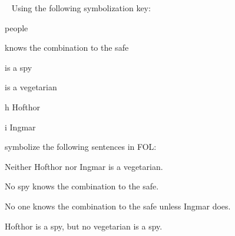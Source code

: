 \
\problempart
\label{pr.FOLvegetarians}
Using the following symbolization key:
\begin{ekey}
\item[\text{论域}] people
\item[\atom{K}{x}]  knows the combination to the safe
\item[\atom{S}{x}]  is a spy
\item[\atom{V}{x}] \gap{x} is a vegetarian
\item[h] Hofthor
\item[i] Ingmar
\end{ekey}
symbolize the following sentences in FOL:
\begin{compactlist}
\item Neither Hofthor nor Ingmar is a vegetarian.
\item[] 
\item No spy knows the combination to the safe.
\item[] 
\item No one knows the combination to the safe unless Ingmar does.
\item[] \myanswer{$\forall x \enot \atom{K}{x} \eor \atom{K}{i}$}
\item Hofthor is a spy, but no vegetarian is a spy.
\item[] 
\end{compactlist}

